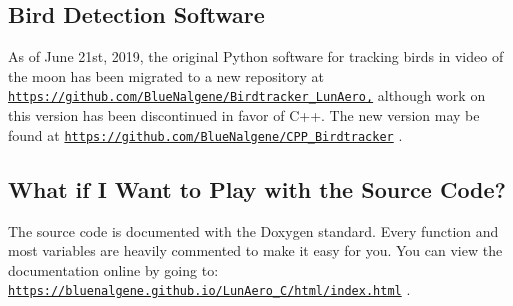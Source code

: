 \subsection*{Bird Detection Software}

As of June 21st, 2019, the original Python software for tracking birds in video of the moon has been migrated to a new repository at \href{https://github.com/BlueNalgene/Birdtracker_LunAero,}{\tt https\+://github.\+com/\+Blue\+Nalgene/\+Birdtracker\+\_\+\+Lun\+Aero,} although work on this version has been discontinued in favor of C++. The new version may be found at \href{https://github.com/BlueNalgene/CPP_Birdtracker}{\tt https\+://github.\+com/\+Blue\+Nalgene/\+C\+P\+P\+\_\+\+Birdtracker} .

\subsection*{What if I Want to Play with the Source Code?}

The source code is documented with the {\ttfamily Doxygen} standard. Every function and most variables are heavily commented to make it easy for you. You can view the documentation online by going to\+: \href{https://bluenalgene.github.io/LunAero_C/html/index.html}{\tt https\+://bluenalgene.\+github.\+io/\+Lun\+Aero\+\_\+\+C/html/index.\+html} . 